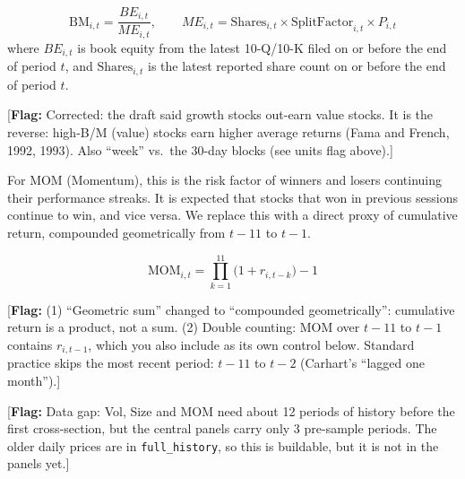 \documentclass[11pt]{article}
\newcommand{\flag}[1]{{\color{red!75!black}\small [\textbf{Flag:} #1]}}
\begin{document}
\begin{equation}
\text{BM}_{i,t} = \frac{BE_{i,t}}{ME_{i,t}}, \qquad ME_{i,t} = \text{Shares}_{i,t} \times \text{SplitFactor}_{i,t} \times P_{i,t}
\end{equation}
where $BE_{i,t}$ is book equity from the latest 10-Q/10-K filed on or before the end of period $t$, and $\text{Shares}_{i,t}$ is the latest reported share count on or before the end of period $t$.

\flag{Corrected: the draft said growth stocks out-earn value stocks. It is the reverse: high-B/M (value) stocks earn higher average returns (Fama and French, 1992, 1993). Also ``week'' vs.\ the 30-day blocks (see units flag above).}

For MOM (Momentum), this is the risk factor of winners and losers continuing their performance streaks. It is expected that stocks that won in previous sessions continue to win, and vice versa. We replace this with a direct proxy of cumulative return, compounded geometrically from $t-11$ to $t-1$.

\begin{equation}
\text{MOM}_{i,t} = \prod_{k=1}^{11}\big(1 + r_{i,t-k}\big) - 1
\end{equation}

\flag{(1) ``Geometric sum'' changed to ``compounded geometrically'': cumulative return is a product, not a sum. (2) Double counting: MOM over $t-11$ to $t-1$ contains $r_{i,t-1}$, which you also include as its own control below. Standard practice skips the most recent period: $t-11$ to $t-2$ (Carhart's ``lagged one month'').}

\flag{Data gap: Vol, Size and MOM need about 12 periods of history before the first cross-section, but the central panels carry only 3 pre-sample periods. The older daily prices are in \texttt{full\_history}, so this is buildable, but it is not in the panels yet.}
\end{document}
